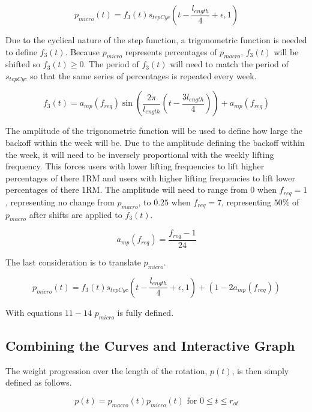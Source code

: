 \begin{equation*}
    p_{micro}(t)=f_3(t)s_{tepCyc}\left( t-\frac{l_{ength}}{4}+\epsilon,1 \right)
\end{equation*}

Due to the cyclical nature of the step function, a trigonometric function is needed to define $f_3(t)$. Because $p_{micro}$ represents percentages of $p_{macro}$, $f_3(t)$ will be shifted so $f_3(t)\ge 0$. The period of $f_3(t)$ will need to match the period of $s_{tepCyc}$ so that the same series of percentages is repeated every week.

\begin{equation}
    f_3(t)=a_{mp}(f_{req})\sin\left( \frac{2\pi}{l_{ength}}\left( t-\frac{3l_{ength}}{4} \right) \right)+a_{mp}(f_{req})
\end{equation}

The amplitude of the trigonometric function will be used to define how large the backoff within the week will be. Due to the amplitude defining the backoff within the week, it will need to be inversely proportional with the weekly lifting frequency. This forces users with lower lifting frequencies to lift higher percentages of there 1RM and users with higher lifting frequencies to lift lower percentages of there 1RM. The amplitude will need to range from $0$ when $f_{req}=1$, representing no change from $p_{macro}$, to $0.25$ when $f_{req}=7$, representing $50\%$ of $p_{macro}$ after shifts are applied to $f_3(t)$. 

\begin{equation}
    a_{mp}(f_{req})=\frac{f_{req}-1}{24}
\end{equation}

The last consideration is to translate $p_{micro}$.

\begin{equation}
    p_{micro}(t)=f_3(t)s_{tepCyc}\left (t-\frac{l_{ength}}{4}+\epsilon,1\right)+(1-2a_{mp}(f_{req}))
\end{equation}

With equations $11-14$ $p_{micro}$ is fully defined.

\subsection{Combining the Curves and Interactive Graph}
The weight progression over the length of the rotation, $p(t)$, is then simply defined as follows.

\begin{equation}
    p(t)=p_{macro}(t)p_{micro}(t) \text{ for $0\le t \le r_{ot}$}
\end{equation}

